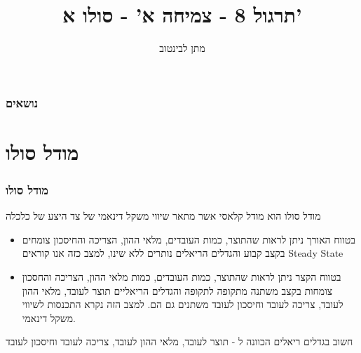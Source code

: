 \documentclass[usenames,dvipsnames]{beamer}
\title{תרגול 8 - צמיחה א' - סולו א'}
\author{\texthebrew{ מתן לבינטוב}}
\institute[{{ אב"ג}}]{{ אוניברסיטת בן גוריון בנגב}}
\date{}
\begin{document}
\begin{RTL}
\begin{frame}
\titlepage
\end{frame}
\begin{frame}
    \frametitle{נושאים}
    \tableofcontents

    

\end{frame}

\section{מודל סולו}
\begin{frame}[allowframebreaks]
    \frametitle{מודל סולו}
    מודל סולו הוא מודל קלאסי אשר מתאר שיווי משקל דינאמי של צד היצע של כלכלה
    \begin{itemize}
        \item בטווח האורך  ניתן לראות שהתוצר, כמות העובדים, מלאי ההון, הצריכה והחיסכון צומחים בקצב קבוע והגדלים הריאלים נותרים ללא שינו, למצב כזה אנו קוראים Steady State
        \item בטווח הקצר ניתן לראות שהתוצר, כמות העובדים, כמות מלאי ההון, הצריכה והחסכון צומחות
        בקצב משתנה מתקופה לתקופה והגדלים הריאליים תוצר לעובד, מלאי ההון לעובד, צריכה
        לעובד וחיסכון לעובד  משתנים גם הם. למצב הזה נקרא התכנסות לשיווי משקל דינאמי.
    \end{itemize}
    \begin{alertblock}{חשוב}
        בגדלים ריאלים הכוונה ל - תוצר לעובד, מלאי ההון לעובד, צריכה לעובד
        וחיסכון לעובד
    \end{alertblock}

    \framebreak

    

\end{frame}
\end{RTL}
\end{document}
